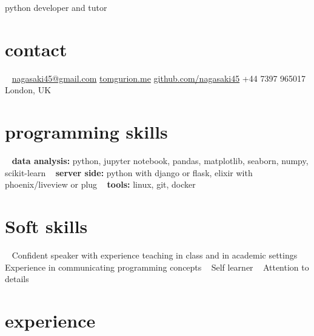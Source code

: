\documentclass[]{friggeri-cv}
\begin{document}
       {python developer and tutor}



\begin{aside}
\section{contact}
~
\href{mailto:nagasaki45@gmail.com}{nagasaki45@gmail.com}
\href{http://tomgurion.me}{tomgurion.me}
\href{https://github.com/nagasaki45}{github.com/nagasaki45}
+44 7397 965017
London, UK
~
\section{programming skills}
~
\textbf{data analysis:} python, jupyter notebook, pandas, matplotlib, seaborn, numpy, scikit-learn
~
\textbf{server side:} python with django or flask, elixir with phoenix/liveview or plug
~
\textbf{tools:} linux, git, docker
~
\section{Soft skills}
~
Confident speaker with experience teaching in class and in academic settings
~
Experience in communicating programming concepts
~
Self learner
~
Attention to details
\end{aside}



\section{experience}
\end{document}
